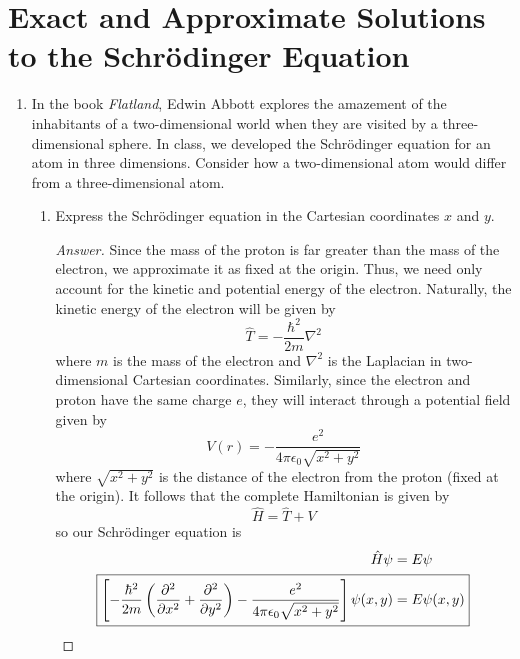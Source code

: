 \documentclass[../psets.tex]{subfiles}
\begin{document}
\section{Exact and Approximate Solutions to the Schr\"{o}dinger Equation}
\begin{enumerate}
    \item {}In the book \emph{Flatland}, Edwin Abbott explores the amazement of the inhabitants of a two-dimensional world when they are visited by a three-dimensional sphere. In class, we developed the Schr\"{o}dinger equation for an atom in three dimensions. Consider how a two-dimensional atom would differ from a three-dimensional atom.
    \begin{enumerate}
        \item Express the Schr\"{o}dinger equation in the Cartesian coordinates $x$ and $y$.
        \begin{proof}[Answer]
            Since the mass of the proton is far greater than the mass of the electron, we approximate it as fixed at the origin. Thus, we need only account for the kinetic and potential energy of the electron. Naturally, the kinetic energy of the electron will be given by
            \begin{equation*}
                \hat{T} = -\frac{\hbar^2}{2m}\nabla^2
            \end{equation*}
            where $m$ is the mass of the electron and $\nabla^2$ is the Laplacian in two-dimensional Cartesian coordinates. Similarly, since the electron and proton have the same charge $e$, they will interact through a potential field given by
            \begin{equation*}
                V(r) = -\frac{e^2}{4\pi\epsilon_0\sqrt{x^2+y^2}}
            \end{equation*}
            where $\sqrt{x^2+y^2}$ is the distance of the electron from the proton (fixed at the origin). It follows that the complete Hamiltonian is given by
            \begin{equation*}
                \hat{H} = \hat{T}+V
            \end{equation*}
            so our Schr\"{o}dinger equation is
            \begin{align*}
                \hat{H}\psi &= E\psi\\
                \Aboxed{\left[ -\frac{\hbar^2}{2m}\left( \pdv[2]{x}+\pdv[2]{y} \right)-\frac{e^2}{4\pi\epsilon_0\sqrt{x^2+y^2}} \right]\psi(x,y) &= E\psi(x,y)}
            \end{align*}

\end{proof}
\end{enumerate}
\end{enumerate}
\end{document}
